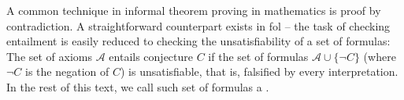 

A common technique in informal theorem proving in mathematics is proof by contradiction.
A straightforward counterpart exists in \gls{fol} --
the task of checking
entailment is easily reduced to
checking the
unsatisfiability of a set of formulas:
The set of axioms $\mathcal{A}$ entails conjecture $C$ if the set of formulas $\mathcal{A} \cup \{\lnot C\}$ (where $\lnot C$ is the negation of $C$) is unsatisfiable, that is, falsified by every interpretation.
In the rest of this text, we call such set of formulas a .


